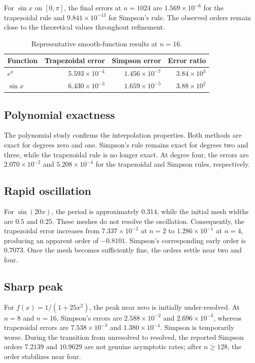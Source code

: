 \documentclass[11pt]{article}
\begin{document}
For $\sin x$ on $[0,\pi]$, the final errors at $n=1024$ are $1.569\times10^{-6}$ for the trapezoidal rule and $9.841\times10^{-13}$ for Simpson's rule. The observed orders remain close to the theoretical values throughout refinement.

\begin{table}[H]
\centering
\caption{Representative smooth-function results at $n=16$.}
\begin{tabular}{lrrr}
\toprule
Function & Trapezoidal error & Simpson error & Error ratio\\
\midrule
$e^x$ & $5.593\times10^{-4}$ & $1.456\times10^{-7}$ & $3.84\times10^3$\\
$\sin x$ & $6.430\times10^{-3}$ & $1.659\times10^{-5}$ & $3.88\times10^2$\\
\bottomrule
\end{tabular}
\end{table}

\subsection{Polynomial exactness}
The polynomial study confirms the interpolation properties. Both methods are exact for degrees zero and one. Simpson's rule remains exact for degrees two and three, while the trapezoidal rule is no longer exact. At degree four, the errors are $2.070\times10^{-2}$ and $5.208\times10^{-4}$ for the trapezoidal and Simpson rules, respectively.

\subsection{Rapid oscillation}
For $\sin(20x)$, the period is approximately $0.314$, while the initial mesh widths are $0.5$ and $0.25$. These meshes do not resolve the oscillation. Consequently, the trapezoidal error increases from $7.337\times10^{-2}$ at $n=2$ to $1.286\times10^{-1}$ at $n=4$, producing an apparent order of $-0.8101$. Simpson's corresponding early order is $0.7073$. Once the mesh becomes sufficiently fine, the orders settle near two and four.

\subsection{Sharp peak}
For $f(x)=1/(1+25x^2)$, the peak near zero is initially under-resolved. At $n=8$ and $n=16$, Simpson's errors are $2.588\times10^{-2}$ and $2.696\times10^{-3}$, whereas trapezoidal errors are $7.538\times10^{-3}$ and $1.380\times10^{-4}$. Simpson is temporarily worse. During the transition from unresolved to resolved, the reported Simpson orders $7.2139$ and $10.9629$ are not genuine asymptotic rates; after $n\ge128$, the order stabilizes near four.
\end{document}
